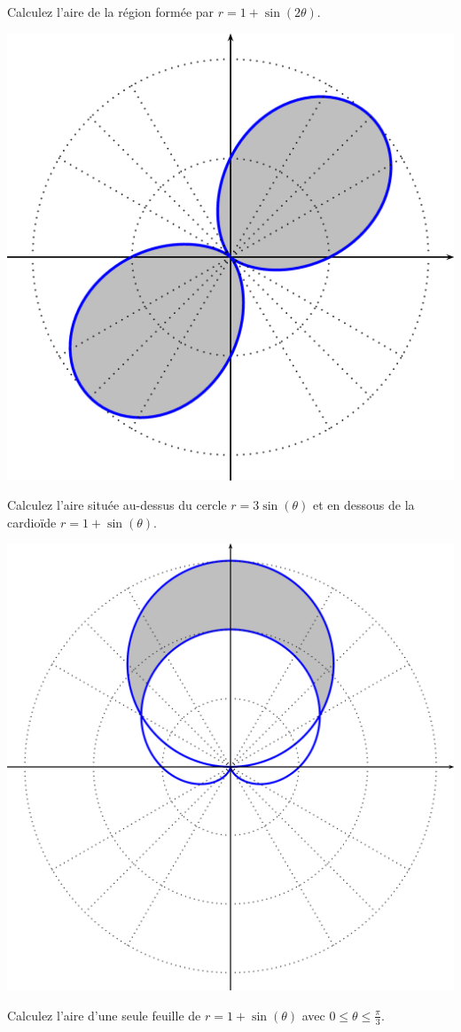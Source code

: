 \documentclass[]{book}
\theoremstyle{definition}
\theoremstyle{definition}
\theoremstyle{definition}
\theoremstyle{remark}
\let\BeginKnitrBlock\begin \let\EndKnitrBlock\end
\begin{document}
\BeginKnitrBlock{example}
\protect\hypertarget{exm:unnamed-chunk-108}{}{\label{exm:unnamed-chunk-108}
}Calculez l'aire de la région formée par \(r=1+\sin(2\theta)\).
\EndKnitrBlock{example}

\begin{center}\includegraphics[width=0.5\linewidth]{resources/images/latex/ex1airepolaire} \end{center}
\vspace*{10cm}

\BeginKnitrBlock{example}
\protect\hypertarget{exm:unnamed-chunk-109}{}{\label{exm:unnamed-chunk-109}
}Calculez l'aire située au-dessus du cercle \(r=3\sin(\theta)\) et en
dessous de la cardioïde \(r=1+\sin(\theta)\).
\EndKnitrBlock{example}

\begin{center}\includegraphics[width=0.5\linewidth]{resources/images/latex/ex2airepolaire} \end{center}
\vspace*{10cm}

\BeginKnitrBlock{example}
\protect\hypertarget{exm:unnamed-chunk-110}{}{\label{exm:unnamed-chunk-110}
}Calculez l'aire d'une seule feuille de \(r=1+\sin(\theta)\) avec
\(0\leq \theta \leq \frac{\pi}{3}\).
\EndKnitrBlock{example}
\vspace*{10cm}
\end{document}
